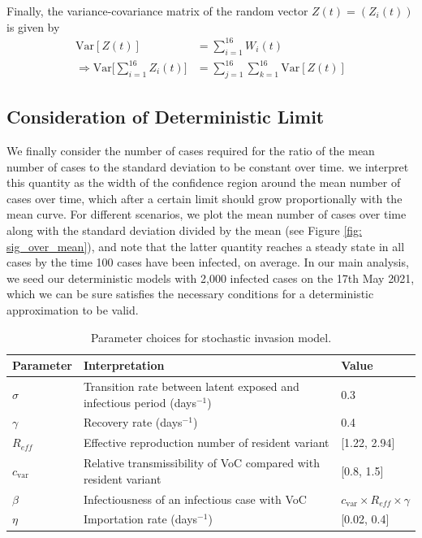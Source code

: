 \documentclass{article}
\begin{document}
Finally, the variance-covariance matrix of the random vector $Z(t) = (Z_i(t))$ is given by 
\begin{align}
{\text{Var}}[Z(t)] &= \sum_{i=1}^{16} W_i(t) \\
\Rightarrow {\text{Var}} \Big[\sum_{i=1}^{16} Z_i(t)\Big] &= \sum_{j=1}^{16} \sum_{k=1}^{16} {\text{Var}}[Z(t)] \label{variance}
\end{align}

\subsection{Consideration of Deterministic Limit}

We finally consider the number of cases required for the ratio of the mean number of cases to the standard deviation to be constant over time. we interpret this quantity as the width of the confidence region around the mean number of cases over time, which after a certain limit should grow proportionally with the mean curve. For different scenarios, we plot the mean number of cases over time along with the standard deviation divided by the mean (see Figure \ref{fig: sig_over_mean}), and note that the latter quantity reaches a steady state in all cases by the time 100 cases have been infected, on average. In our main analysis, we seed our deterministic models with 2,000 infected cases on the 17th May 2021, which we can be sure satisfies the necessary conditions for a deterministic approximation to be valid. 

\begin{table}[htb] 
\begin{center}
\begin{tabular}{| l | l | l |} \hline
Parameter 	&	Interpretation & Value	\\\hline
$\sigma$	&  Transition rate between latent exposed and infectious period (days$^{-1}$) 	&	0.3 \\\hline
$\gamma$	&	Recovery rate (days$^{-1}$) 	&	0.4\\\hline
$R_{eff}$	& Effective reproduction number of resident variant 	&	[1.22, 2.94] \\\hline
$c_{\text{var}}$	& Relative transmissibility of VoC compared with resident variant 	&  [0.8, 1.5] \\\hline
$\beta$	&	Infectiousness of an infectious case with VoC	&  $c_{\text{var}} \times R_{eff} \times \gamma $\\\hline
$\eta$	&	Importation rate (days$^{-1}$) 	&  [0.02, 0.4] \\\hline
\end{tabular}

\caption{Parameter choices for stochastic invasion model.} 
\label{Table:overall_all} 
\end{center}
\end{table}
\end{document}
